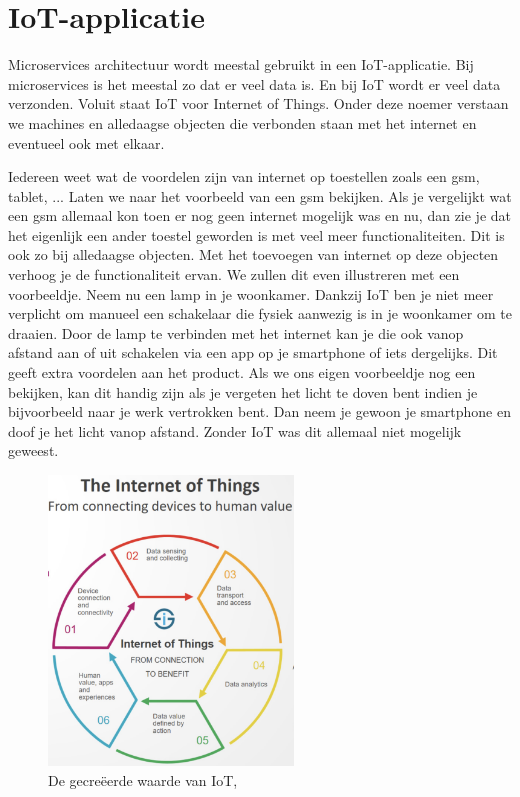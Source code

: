 \autocite{Google2019}

\section{IoT-applicatie}
Microservices architectuur wordt meestal gebruikt in een IoT-applicatie. Bij microservices is het meestal zo dat er veel data is. En bij IoT wordt er veel data verzonden. Voluit staat IoT voor Internet of Things. Onder deze noemer verstaan we machines en alledaagse objecten die verbonden staan met het internet en eventueel ook met elkaar.

Iedereen weet wat de voordelen zijn van internet op toestellen zoals een gsm, tablet, ... Laten we naar het voorbeeld van een gsm bekijken. Als je vergelijkt wat een gsm allemaal kon toen er nog geen internet mogelijk was en nu, dan zie je dat het eigenlijk een ander toestel geworden is met veel meer functionaliteiten. Dit is ook zo bij alledaagse objecten. Met het toevoegen van internet op deze objecten verhoog je de functionaliteit ervan. We zullen dit even illustreren met een voorbeeldje. Neem nu een lamp in je woonkamer. Dankzij IoT ben je niet meer verplicht om manueel een schakelaar die fysiek aanwezig is in je woonkamer om te draaien. Door de lamp te verbinden met het internet kan je die ook vanop afstand aan of uit schakelen via een app op je smartphone of iets dergelijks. Dit geeft extra voordelen aan het product. Als we ons eigen voorbeeldje nog een bekijken, kan dit handig zijn als je vergeten het licht te doven bent indien je bijvoorbeeld naar je werk vertrokken bent. Dan neem je gewoon je smartphone en doof je het licht vanop afstand. Zonder IoT was dit allemaal niet mogelijk geweest.

 \begin{figure}[h!]
    \centering
    \includegraphics[width=65mm]{../IoT.png}
    \caption{De gecreëerde waarde van IoT, \autocite{i-scoop2019}}
    
\end{figure}

